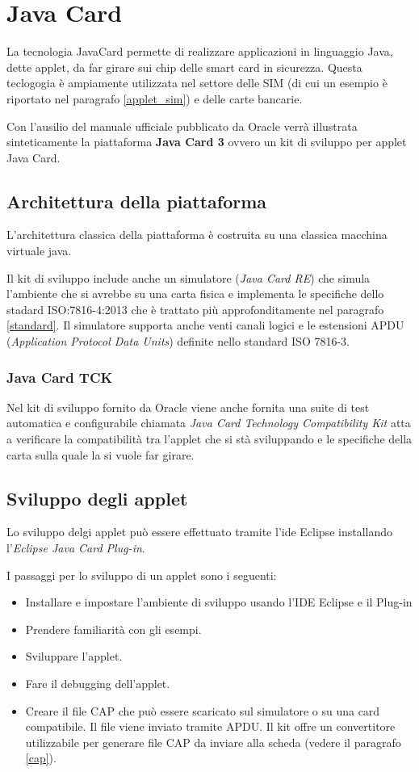 \section{Java Card}
\label{java_card}
La tecnologia JavaCard permette di realizzare applicazioni in linguaggio Java, dette applet, da far girare sui chip delle smart card in sicurezza. Questa teclogogia è ampiamente utilizzata nel settore delle SIM (di cui un esempio è riportato nel paragrafo \ref{applet_sim}) e delle carte bancarie.
\cite{Wiki_java}

Con l'ausilio del manuale ufficiale pubblicato da Oracle \cite{javacard3platform} verrà illustrata sinteticamente la piattaforma \textbf{Java Card 3} ovvero un kit di sviluppo per applet Java Card.
\subsection{Architettura della piattaforma}
L'architettura classica della piattaforma è costruita su una classica macchina virtuale java.

Il kit di sviluppo include anche un simulatore (\textit{Java Card RE}) che simula l'ambiente che si avrebbe su una carta fisica e implementa le specifiche dello stadard ISO:7816-4:2013 che è trattato più approfonditamente nel paragrafo \ref{standard}. Il simulatore supporta anche venti canali logici e le estensioni APDU (\textit{Application Protocol Data Units}) definite nello standard ISO 7816-3.
\subsubsection{Java Card TCK}
Nel kit di sviluppo fornito da Oracle viene anche fornita una suite di test automatica e configurabile chiamata \textit{Java Card Technology Compatibility Kit} atta a verificare la compatibilità tra l'applet che si stà sviluppando e le specifiche della carta sulla quale la si vuole far girare.

\subsection{Sviluppo degli applet}
Lo sviluppo delgi applet può essere effettuato tramite l'ide Eclipse installando l'\textit{Eclipse Java Card Plug-in}.

I passaggi per lo sviluppo di un applet sono i seguenti:
\begin{itemize}
    \item Installare e impostare l'ambiente di sviluppo usando l'IDE Eclipse e il Plug-in
    \item Prendere familiarità con gli esempi.
    \item Sviluppare l'applet.
    \item Fare il debugging dell'applet.
    \item Creare il file CAP che può essere scaricato sul simulatore o su una card compatibile. Il file viene inviato tramite APDU. Il kit offre un convertitore utilizzabile per generare file CAP da inviare alla scheda (vedere il paragrafo \ref{cap}).
\end{itemize}

